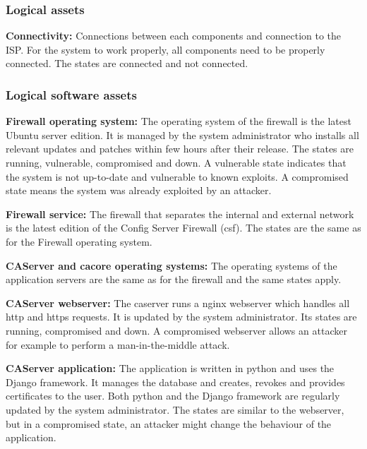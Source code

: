 \documentclass[english]{article}
\begin{document}
\subsubsection{Logical assets}
	\begin{description}
		\item{\textbf{Connectivity:}} Connections between each components and connection to the ISP. For the system to work properly, all components need to be properly connected. The states are connected and not connected.
	\end{description}

\subsubsection{Logical software assets}

	\begin{description}
		\item{\textbf{Firewall operating system:}} The operating system of the firewall is the latest Ubuntu server edition. It is managed by the system administrator who installs all relevant updates and patches within few hours after their release. The states are running, vulnerable, compromised and down. A vulnerable state indicates that the system is not up-to-date and vulnerable to known exploits. A compromised state means the system was already exploited by an attacker.
		\item{\textbf{Firewall service:}} The firewall that separates the internal and external network is the latest edition of the Config Server Firewall (csf). The states are the same as for the Firewall operating system.
		\item{\textbf{CAServer and cacore operating systems:}} The operating systems of the application servers are the same as for the firewall and the same states apply.
		\item{\textbf{CAServer webserver:}} The caserver runs a nginx webserver which handles all http and https requests. It is updated by the system administrator. Its states are running, compromised and down. A compromised webserver allows an attacker for example to perform a man-in-the-middle attack.
		\item{\textbf{CAServer application:}} The application is written in python and uses the Django framework. It manages the database and creates, revokes and provides certificates to the user. Both python and the Django framework are regularly updated by the system administrator. The states are similar to the webserver, but in a compromised state, an attacker might change the behaviour of the application.

\end{description}
\end{document}
